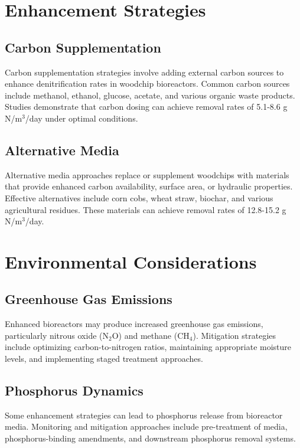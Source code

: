 \documentclass[12pt,a4paper]{article}
\begin{document}
\section{Enhancement Strategies}

\subsection{Carbon Supplementation}

Carbon supplementation strategies involve adding external carbon sources to enhance denitrification rates in woodchip bioreactors. Common carbon sources include methanol, ethanol, glucose, acetate, and various organic waste products. Studies demonstrate that carbon dosing can achieve removal rates of 5.1-8.6 g N/m$^3$/day under optimal conditions.

\subsection{Alternative Media}

Alternative media approaches replace or supplement woodchips with materials that provide enhanced carbon availability, surface area, or hydraulic properties. Effective alternatives include corn cobs, wheat straw, biochar, and various agricultural residues. These materials can achieve removal rates of 12.8-15.2 g N/m$^3$/day.

\section{Environmental Considerations}

\subsection{Greenhouse Gas Emissions}

Enhanced bioreactors may produce increased greenhouse gas emissions, particularly nitrous oxide (N$_2$O) and methane (CH$_4$). Mitigation strategies include optimizing carbon-to-nitrogen ratios, maintaining appropriate moisture levels, and implementing staged treatment approaches.

\subsection{Phosphorus Dynamics}

Some enhancement strategies can lead to phosphorus release from bioreactor media. Monitoring and mitigation approaches include pre-treatment of media, phosphorus-binding amendments, and downstream phosphorus removal systems.
\end{document}
